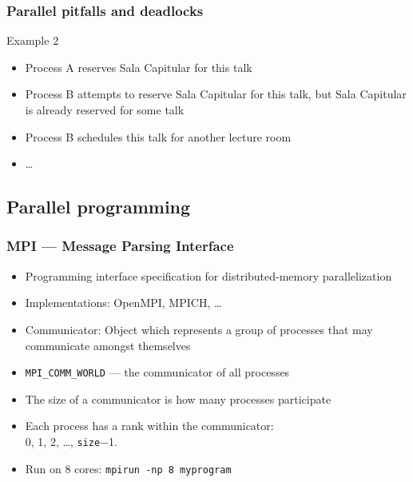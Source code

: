 \documentclass[usenames,dvipsnames,mathserif,compress]{beamer}
\begin{document}
\begin{frame}
  \frametitle{Parallel pitfalls and deadlocks}
  \begin{block}{Example 2}
    \begin{itemize}
    \item Process A reserves Sala Capitular for this talk
    \item Process B attempts to reserve Sala Capitular for this talk,
      but Sala Capitular is already reserved for some talk
    \item Process B schedules this talk for another lecture room
    \item \ldots
  \end{itemize}
  \end{block}
\end{frame}

\subsection*{Parallel programming}

\begin{frame}[fragile]
  \frametitle{MPI --- Message Parsing Interface}
  \begin{itemize}
  \item Programming interface specification for distributed-memory parallelization
  \item Implementations: OpenMPI, MPICH, \ldots
  \item \alert{Communicator}: Object which represents a group of processes that may communicate amongst themselves
  \item \verb#MPI_COMM_WORLD# --- the communicator of all processes
  \item The \alert{size} of a communicator is how many processes participate
  \item Each process has a \alert{rank} within the communicator:\\ 0, 1, 2, \ldots, \texttt{size}$-$1.
  \item Run on 8 cores: \texttt{mpirun -np 8 myprogram}
  \end{itemize}
\end{frame}
\end{document}
